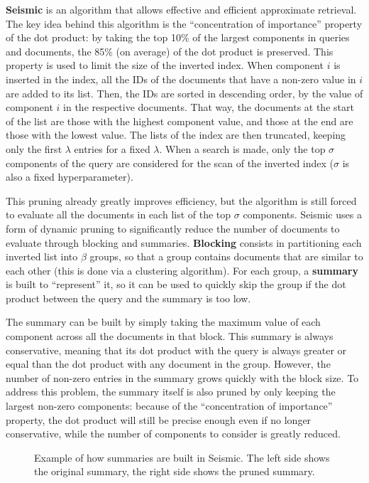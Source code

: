 \textbf{Seismic} is an algorithm that allows effective and efficient approximate retrieval. The key idea behind this algorithm is the ``concentration of importance'' property of the dot product: by taking the top 10\% of the largest components in queries and documents, the 85\% (on average) of the dot product is preserved. This property is used to limit the size of the inverted index. When component $i$ is inserted in the index, all the IDs of the documents that have a non-zero value in $i$ are added to its list. Then, the IDs are sorted in descending order, by the value of component $i$ in the respective documents. That way, the documents at the start of the list are those with the highest component value, and those at the end are those with the lowest value. The lists of the index are then truncated, keeping only the first $\lambda$ entries for a fixed $\lambda$. When a search is made, only the top $\sigma$ components of the query are considered for the scan of the inverted index ($\sigma$ is also a fixed hyperparameter).

This pruning already greatly improves efficiency, but the algorithm is still forced to evaluate all the documents in each list of the top $\sigma$ components. Seismic uses a form of dynamic pruning to significantly reduce the number of documents to evaluate through blocking and summaries. \textbf{Blocking} consists in partitioning each inverted list into $\beta$ groups, so that a group contains documents that are similar to each other (this is done via a clustering algorithm). For each group, a \textbf{summary} is built to ``represent'' it, so it can be used to quickly skip the group if the dot product between the query and the summary is too low.

The summary can be built by simply taking the maximum value of each component across all the documents in that block. This summary is always conservative, meaning that its dot product with the query is always greater or equal than the dot product with any document in the group. However, the number of non-zero entries in the summary grows quickly with the block size. To address this problem, the summary itself is also pruned by only keeping the largest non-zero components: because of the ``concentration of importance'' property, the dot product will still be precise enough even if no longer conservative, while the number of components to consider is greatly reduced.
\begin{figure}[h]
    \vspace{10pt}
    \centering
    
    \caption{Example of how summaries are built in Seismic. The left side shows the original summary, the right side shows the pruned summary.}
\end{figure}
